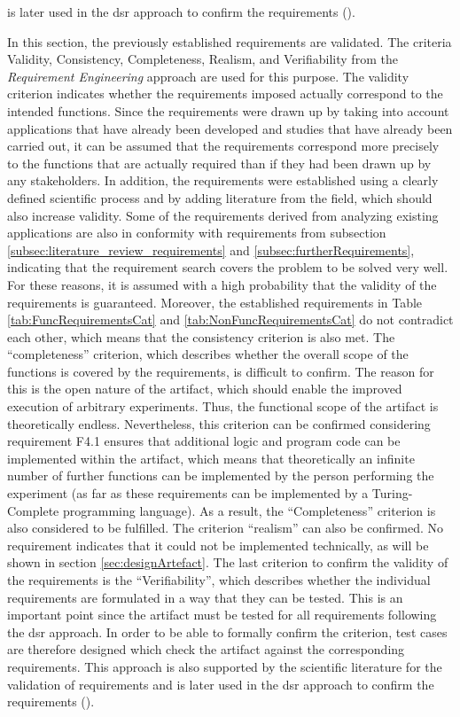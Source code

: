 is later used in the \ac{dsr} approach to confirm the requirements (\cite{Sommerville.2011}).

In this section, the previously established requirements are validated. The criteria Validity, Consistency, Completeness, Realism, and Verifiability from the \textit{Requirement Engineering} approach are used for this purpose. The validity criterion indicates whether the requirements imposed actually correspond to the intended functions. Since the requirements were drawn up by taking into account applications that have already been developed and studies that have already been carried out, it can be assumed that the requirements correspond more precisely to the functions that are actually required than if they had been drawn up by any stakeholders. In addition, the requirements were established using a clearly defined scientific process and by adding literature from the field, which should also increase validity. Some of the requirements derived from analyzing existing applications are also in conformity with requirements from subsection \ref{subsec:literature_review_requirements} and \ref{subsec:furtherRequirements}, indicating that the requirement search covers the problem to be solved very well. For these reasons, it is assumed with a high probability that the validity of the requirements is guaranteed. Moreover, the established requirements in Table \ref{tab:FuncRequirementsCat} and \ref{tab:NonFuncRequirementsCat} do not contradict each other, which means that the consistency criterion is also met. The \enquote{completeness} criterion, which describes whether the overall scope of the functions is covered by the requirements, is difficult to confirm. The reason for this is the open nature of the artifact, which should enable the improved execution of arbitrary experiments. Thus, the functional scope of the artifact is theoretically endless. Nevertheless, this criterion can be confirmed considering requirement F4.1 ensures that additional logic and program code can be implemented within the artifact, which means that theoretically an infinite number of further functions can be implemented by the person performing the experiment (as far as these requirements can be implemented by a Turing-Complete programming language). As a result, the \enquote{Completeness} criterion is also considered to be fulfilled. The criterion \enquote{realism} can also be confirmed. No requirement indicates that it could not be implemented technically, as will be shown in section \ref{sec:designArtefact}. The last criterion to confirm the validity of the requirements is the \enquote{Verifiability}, which describes whether the individual requirements are formulated in a way that they can be tested. This is an important point since the artifact must be tested for all requirements following the \ac{dsr} approach. In order to be able to formally confirm the criterion, test cases are therefore designed which check the artifact against the corresponding requirements. This approach is also supported by the scientific literature for the validation of requirements and is later used in the \ac{dsr} approach to confirm the requirements (\cite{Sommerville.2011}).


